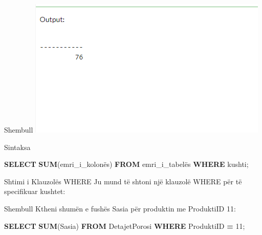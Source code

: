 \documentclass[
  ignorenonframetext,
]{beamer}
\newenvironment{Shaded}{\begin{snugshade}}{\end{snugshade}}
\newcommand{\DecValTok}[1]{\textcolor[rgb]{0.00,0.00,0.81}{#1}}
\newcommand{\FunctionTok}[1]{\textcolor[rgb]{0.13,0.29,0.53}{\textbf{#1}}}
\newcommand{\KeywordTok}[1]{\textcolor[rgb]{0.13,0.29,0.53}{\textbf{#1}}}
\newcommand{\NormalTok}[1]{#1}
\newcommand{\OperatorTok}[1]{\textcolor[rgb]{0.81,0.36,0.00}{\textbf{#1}}}
\begin{document}
\begin{frame}{Shembull}
\label{shembull-36}
\includegraphics{./Figs/query50.png}
\end{frame}

\begin{frame}[fragile]{Sintaksa}
\label{sintaksa-1}

\begin{Shaded}
\begin{Highlighting}[]
\KeywordTok{SELECT} \FunctionTok{SUM}\NormalTok{(emri\_i\_kolonës)}
\KeywordTok{FROM}\NormalTok{ emri\_i\_tabelës}
\KeywordTok{WHERE}\NormalTok{ kushti;}
\end{Highlighting}
\end{Shaded}
\end{frame}

\begin{frame}{Shtimi i Klauzolës WHERE}
\label{shtimi-i-klauzoluxebs-where-3}
Ju mund të shtoni një klauzolë WHERE për të specifikuar kushtet:
\end{frame}

\begin{frame}[fragile]{Shembull}
\label{shembull-37}
Ktheni shumën e fushës Sasia për produktin me ProduktiID 11:


\begin{Shaded}
\begin{Highlighting}[]
\KeywordTok{SELECT} \FunctionTok{SUM}\NormalTok{(Sasia)}
\KeywordTok{FROM}\NormalTok{ DetajetPorosi}
\KeywordTok{WHERE}\NormalTok{ ProduktiID }\OperatorTok{=} \DecValTok{11}\NormalTok{;}
\end{Highlighting}
\end{Shaded}
\end{frame}
\end{document}
